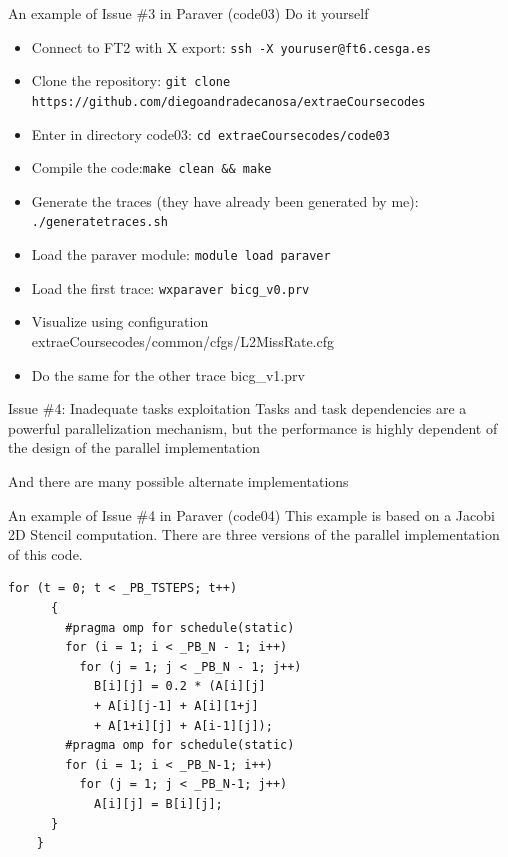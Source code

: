 \documentclass[10pt,xcolor=table]{beamer}
\begin{document}
\begin{frame}{An example of Issue \#3 in Paraver (code03)}
Do it yourself
\begin{itemize}
    \item Connect to FT2 with X export: {\tt ssh -X youruser@ft6.cesga.es}
    \item Clone the repository: {\tt git clone https://github.com/diegoandradecanosa/extraeCoursecodes}
    \item Enter in directory code03: {\tt cd extraeCoursecodes/code03}
        \item Compile the code:{\tt make clean \&\& make}
    \item Generate the traces (they have already been generated by me): {\tt ./generatetraces.sh}
    \item Load the paraver module:  {\tt module load paraver}
    \item Load the first trace: {\tt wxparaver bicg\_v0.prv}
    \item Visualize using configuration extraeCoursecodes/common/cfgs/L2MissRate.cfg 
    \item Do the same for the other trace bicg\_v1.prv
\end{itemize}
\end{frame}

\begin{frame}{Issue \#4: Inadequate tasks exploitation}
Tasks and task dependencies are a powerful parallelization mechanism, but the performance is highly dependent of the design of the parallel implementation

And there are many possible alternate implementations
\end{frame}

\begin{frame}[fragile]{An example of Issue \#4 in Paraver (code04)}
This example is based on a Jacobi 2D Stencil computation. There are three versions of the parallel implementation of this code. 
\begin{lstlisting}[style=shell,basicstyle=\scriptsize\ttfamily,gobble=3,caption={Parallelized with for pragmas (v0)}]
     for (t = 0; t < _PB_TSTEPS; t++)
      {
        #pragma omp for schedule(static) 
        for (i = 1; i < _PB_N - 1; i++)
          for (j = 1; j < _PB_N - 1; j++)
            B[i][j] = 0.2 * (A[i][j] 
            + A[i][j-1] + A[i][1+j] 
            + A[1+i][j] + A[i-1][j]);
        #pragma omp for schedule(static) 
        for (i = 1; i < _PB_N-1; i++)
          for (j = 1; j < _PB_N-1; j++)
            A[i][j] = B[i][j];
      }
    }
  \end{lstlisting}
\end{frame}
\end{document}

